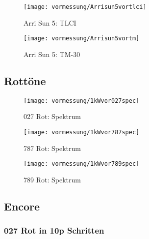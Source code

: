 \documentclass[pagesize,paper=A4,fontsize=12pt,utf8,numbers=noenddot,bibliography=totoc,listof=totoc,DIV=11,BCOR=1mm]{scrreprt}
\begin{document}
\begin{figure}[htp]     %
\centering
\texttt{[image: vormessung/Arrisun5vortlci]} 
\caption {Arri Sun 5: TLCI} 
\end{figure}


\begin{figure}[htp]     %
\centering
\texttt{[image: vormessung/Arrisun5vortm]} 
\caption {Arri Sun 5: TM-30} 
\end{figure}

\subsection{Rottöne}

\begin{figure}[htp]     %
\centering
\texttt{[image: vormessung/1kWvor027spec]} 
\caption {027 Rot: Spektrum} 
\end{figure}

\begin{figure}[htp]     %
\centering
\texttt{[image: vormessung/1kWvor787spec]} 
\caption {787 Rot: Spektrum} 
\end{figure}

\begin{figure}[htp]     %
\centering
\texttt{[image: vormessung/1kWvor789spec]} 
\caption {789 Rot: Spektrum} 
\end{figure}



\subsection{Encore}

\subsubsection{027 Rot in 10p Schritten}
\end{document}
